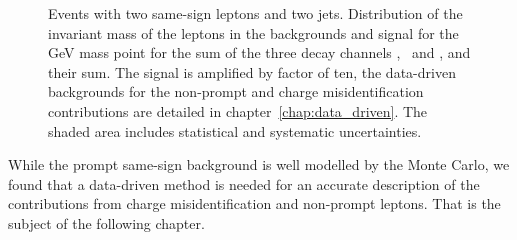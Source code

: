 \begin{figure}[htb]
    \caption{Events with two same-sign leptons and two jets. Distribution of the invariant mass of the leptons in the backgrounds and
        signal for the \unit[550]{GeV} mass point for the sum of the three
        decay channels \E\E, \E\M\ and \M\M, and their sum. The signal is
    amplified by factor of ten, the data-driven backgrounds for the
non-prompt and charge misidentification contributions are detailed in
chapter~\ref{chap:data_driven}. The shaded area includes statistical and
systematic uncertainties.}
    \label{fig:lep_mass}
\end{figure}
While the prompt same-sign background is well modelled by the Monte Carlo, we
found that a data-driven method is needed for an accurate description of the
contributions from charge misidentification and non-prompt leptons.
That is the subject of the following chapter.
